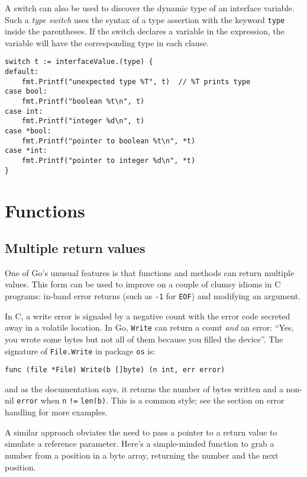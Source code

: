 A switch can also be used to discover the dynamic type of an interface
variable. Such a \emph{type switch} uses the syntax of a type assertion
with the keyword \texttt{type} inside the parentheses. If the switch
declares a variable in the expression, the variable will have the
corresponding type in each clause.

\begin{Verbatim}[frame=single]
switch t := interfaceValue.(type) {
default:
    fmt.Printf("unexpected type %T", t)  // %T prints type
case bool:
    fmt.Printf("boolean %t\n", t)
case int:
    fmt.Printf("integer %d\n", t)
case *bool:
    fmt.Printf("pointer to boolean %t\n", *t)
case *int:
    fmt.Printf("pointer to integer %d\n", *t)
}
\end{Verbatim}

\section*{Functions}

\subsection*{Multiple return values}

One of Go's unusual features is that functions and methods can return
multiple values. This form can be used to improve on a couple of clumsy
idioms in C programs: in-band error returns (such as \texttt{-1} for
\texttt{EOF}) and modifying an argument.

In C, a write error is signaled by a negative count with the error code
secreted away in a volatile location. In Go, \texttt{Write} can return a
count \emph{and} an error: ``Yes, you wrote some bytes but not all of
them because you filled the device''. The signature of
\texttt{File.Write} in package \texttt{os} is:

\begin{Verbatim}[frame=single]
func (file *File) Write(b []byte) (n int, err error)
\end{Verbatim}

and as the documentation says, it returns the number of bytes written
and a non-nil \texttt{error} when \texttt{n} \texttt{!=}
\texttt{len(b)}. This is a common style; see the section on error
handling for more examples.

A similar approach obviates the need to pass a pointer to a return value
to simulate a reference parameter. Here's a simple-minded function to
grab a number from a position in a byte array, returning the number and
the next position.


